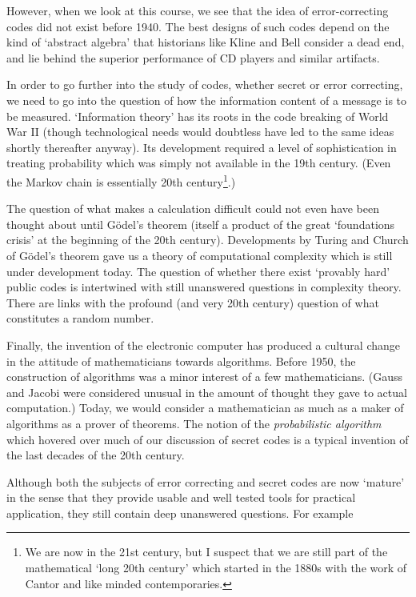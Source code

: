\documentclass[12pt,a4paper]{article}
\theoremstyle{plain}
\theoremstyle{definition}
\begin{document}
However, when we look at this course, we
see that the idea of error-correcting codes
did not exist before 1940. The best
designs of such codes  depend on the kind
of `abstract algebra' that historians
like Kline and Bell  consider a dead end,
and lie behind the superior
performance of  CD players and
similar artifacts.

In order to go further into the study of codes, whether
secret or error correcting, we need to go
into the question of  how the information
content of a message is to be measured.
`Information theory' has its roots in the
code breaking of World War II (though
technological needs would doubtless
have led to the same ideas shortly
thereafter anyway). Its development
required a level of sophistication
in treating probability which was simply
not available in the 19th century.
(Even the Markov chain is essentially 20th
century\footnote{We are now in the 21st century,
but I suspect that we are still part
of the mathematical `long 20th century'
which started in the 1880s with the work of Cantor
and like minded contemporaries.}.)

The question of what makes a calculation difficult
could not even have been thought about until
G\"{o}del's theorem (itself a product of
the great `foundations crisis' at the beginning
of the 20th century). Developments by
Turing and Church of G\"{o}del's theorem
gave us a theory of computational complexity
which is still under development today.
The question of whether there exist
`provably hard' public codes is intertwined
with still unanswered questions in complexity
theory. There are links with the profound
(and very 20th century) question of what
constitutes a random number.

Finally, the invention of the electronic computer
has produced a cultural change in the attitude
of mathematicians towards algorithms. Before 1950,
the construction of algorithms was a minor interest
of a few mathematicians. (Gauss and Jacobi were
considered unusual in the amount of thought they
gave to actual computation.) Today, we would consider
a mathematician
as much as a maker of algorithms as a prover of theorems.
The notion of the \emph{probabilistic algorithm}
which hovered over much of our discussion of
secret codes is a typical invention of the last
decades of the 20th century.

Although both the subjects of error correcting and   
secret codes are now `mature' in the
sense that they provide usable  and well tested
tools for practical application, they still
contain deep unanswered questions. For example
\end{document}
